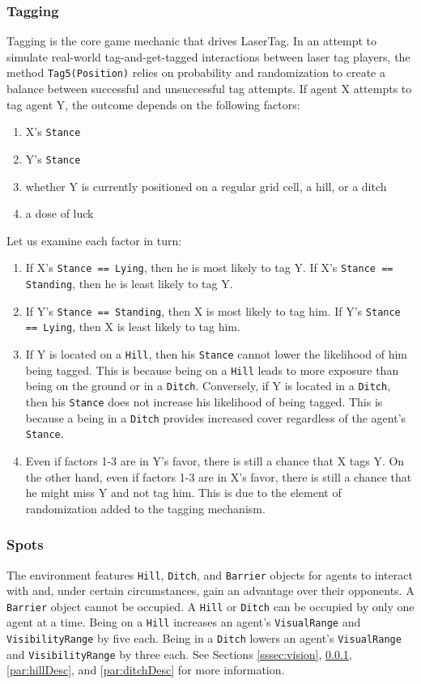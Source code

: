\documentclass[
  a4paper,
  english,
  DIV=16,
  11pt,
  parskip=half,
  dvipsnames,
  listof=totoc,		     %
  index=totoc,		     %
  bibliography=totoc,	 %
]{scrartcl}
\begin{document}
\subsubsection{Tagging} \label{sssec:tagging}
Tagging is the core game mechanic that drives LaserTag. In an attempt to simulate real-world tag-and-get-tagged interactions between laser tag players, the method \texttt{Tag5(Position)} relies on probability and randomization to create a balance between successful and unsuccessful tag attempts. If agent X attempts to tag agent Y, the outcome depends on the following factors:
%
\begin{enumerate}
  \item X's \texttt{Stance}
  \item Y's \texttt{Stance}
  \item whether Y is currently positioned on a regular grid cell, a hill, or a ditch
  \item a dose of luck
\end{enumerate}
%
Let us examine each factor in turn:
%
\begin{enumerate}
  \item If X's \texttt{Stance == Lying}, then he is most likely to tag Y. If X's \texttt{Stance == Standing}, then he is least likely to tag Y.
  \item If Y's \texttt{Stance == Standing}, then X is most likely to tag him. If Y's \texttt{Stance == Lying}, then X is least likely to tag him.
  \item If Y is located on a \texttt{Hill}, then his \texttt{Stance} cannot lower the likelihood of him being tagged. This is because being on a \texttt{Hill} leads to more exposure than being on the ground or in a \texttt{Ditch}. Conversely, if Y is located in a \texttt{Ditch}, then his \texttt{Stance} does not increase his likelihood of being tagged. This is because a being in a \texttt{Ditch} provides increased cover regardless of the agent's \texttt{Stance}.
  \item Even if factors 1-3 are in Y's favor, there is still a chance that X tags Y. On the other hand, even if factors 1-3 are in X's favor, there is still a chance that he might miss Y and not tag him. This is due to the element of randomization added to the tagging mechanism.
\end{enumerate}
%
\subsubsection{Spots} \label{sssec:spot}
The environment features \texttt{Hill}, \texttt{Ditch}, and \texttt{Barrier} objects for agents to interact with and, under certain circumstances, gain an advantage over their opponents. A \texttt{Barrier} object cannot be occupied. A \texttt{Hill} or \texttt{Ditch} can be occupied by only one agent at a time. Being on a \texttt{Hill} increases an agent's \texttt{VisualRange} and \texttt{VisibilityRange} by five each. Being in a \texttt{Ditch} lowers an agent's \texttt{VisualRange} and  \texttt{VisibilityRange} by three each. See Sections \ref{sssec:vision}, \ref{sssec:tagging}, \ref{par:hillDesc}, and \ref{par:ditchDesc} for more information.
\end{document}
